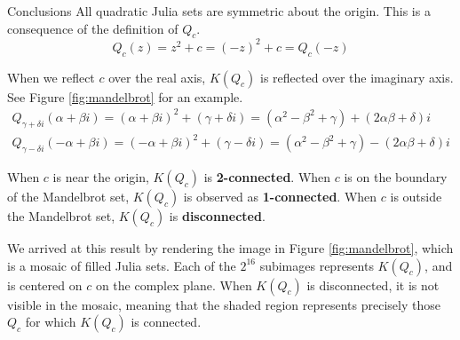 \documentclass[final]{beamer}
\newlength{\colwidth}
\begin{document}
\begin{frame}[t]
\begin{columns}[t]
\begin{column}{\colwidth}
\begin{block}{Conclusions}
		All quadratic Julia sets are symmetric about the origin.
		This is a consequence of the definition of $Q_c$. \[
			Q_c(z) = z^2 + c = (-z)^2 + c = Q_c(-z)
		\]

		When we reflect $c$ over the real axis, $K(Q_c)$
		is reflected over the imaginary axis.
		See Figure \ref{fig:mandelbrot} for an example.
		\begin{gather*}
			Q_{\gamma + \delta i}(\alpha + \beta i) = (\alpha + \beta i)^2 + (\gamma + \delta i) = (\alpha^2 - \beta^2 + \gamma) + (2\alpha \beta + \delta)i \\
			Q_{\gamma - \delta i}(-\alpha + \beta i) = (-\alpha + \beta i)^2 + (\gamma - \delta i) = (\alpha^2 - \beta^2 + \gamma) - (2\alpha \beta + \delta)i
		\end{gather*}

		When $c$ is near the origin, $K(Q_c)$
		is \textbf{2-connected}.
		When $c$ is on the boundary of the Mandelbrot set,
		$K(Q_c)$ is observed as \textbf{1-connected}.
		When $c$ is outside the Mandelbrot set,
		$K(Q_c)$ is \textbf{disconnected}.

		We arrived at this result by rendering the image in Figure \ref{fig:mandelbrot},
		which is a mosaic of filled Julia sets.
		Each of the $2^{16}$ subimages represents $K(Q_c)$,
		and is centered on $c$ on the complex plane.
		When $K(Q_c)$ is disconnected, it is not visible in the mosaic,
		meaning that the shaded region represents precisely those $Q_c$
		for which $K(Q_c)$ is connected.


\end{block}
\end{column}
\end{columns}
\end{frame}
\end{document}
